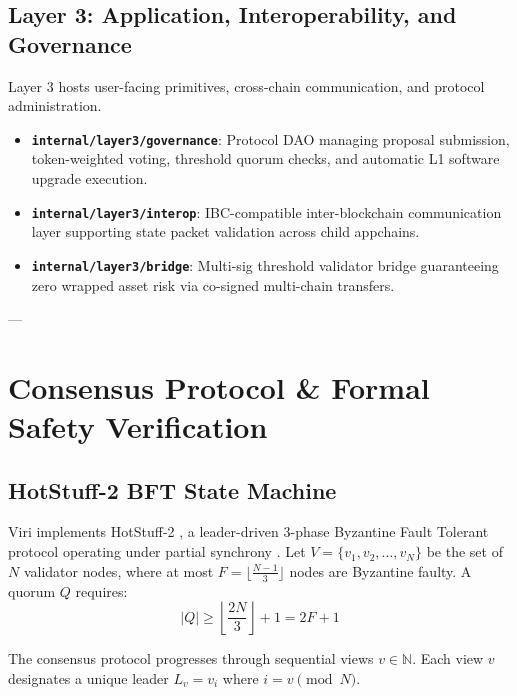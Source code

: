 \documentclass[10pt,journal,compsoc,twocolumn]{IEEEtran}
\begin{document}
\subsection{Layer 3: Application, Interoperability, and Governance}
Layer 3 hosts user-facing primitives, cross-chain communication, and protocol administration.
\begin{itemize}
    \item \textbf{\texttt{internal/layer3/governance}}: Protocol DAO managing proposal submission, token-weighted voting, threshold quorum checks, and automatic L1 software upgrade execution.
    \item \textbf{\texttt{internal/layer3/interop}}: IBC-compatible inter-blockchain communication layer supporting state packet validation across child appchains.
    \item \textbf{\texttt{internal/layer3/bridge}}: Multi-sig threshold validator bridge guaranteeing zero wrapped asset risk via co-signed multi-chain transfers.
\end{itemize}

---

\section{Consensus Protocol \& Formal Safety Verification}
\label{sec:consensus}

\subsection{HotStuff-2 BFT State Machine}
Viri implements HotStuff-2 \cite{yin2019hotstuff}, a leader-driven 3-phase Byzantine Fault Tolerant protocol operating under partial synchrony \cite{dwork1988consensus}. Let $V = \{v_1, v_2, \dots, v_N\}$ be the set of $N$ validator nodes, where at most $F = \lfloor \frac{N-1}{3} \rfloor$ nodes are Byzantine faulty. A quorum $Q$ requires:
\begin{equation}
|Q| \ge \left\lfloor \frac{2N}{3} \right\rfloor + 1 = 2F + 1
\label{eq:quorum}
\end{equation}

The consensus protocol progresses through sequential views $v \in \mathbb{N}$. Each view $v$ designates a unique leader $L_v = v_i$ where $i = v \pmod N$. 
\end{document}
